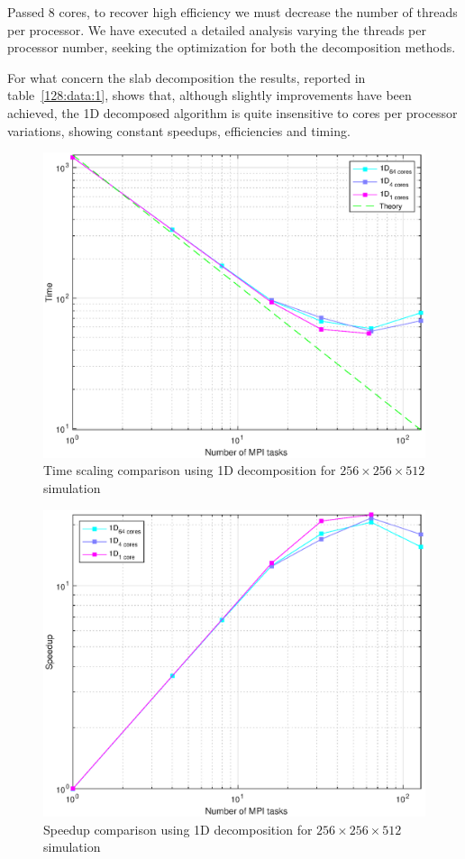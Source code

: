 \par
Passed 8 cores, to recover high efficiency we must decrease the number of threads per processor. We have executed a detailed analysis varying the threads per processor number, seeking the optimization for both the decomposition methods.
\par
For what concern the slab decomposition the results, reported in table~\ref{128:data:1}, shows that, although slightly improvements have been achieved, the 1D decomposed algorithm is quite insensitive to cores per processor variations, showing constant speedups, efficiencies and timing.
\par 
\begin{figure}
\begin{center}
\includegraphics[scale=0.55]{grafici/1284}
\caption{Time scaling comparison using 1D decomposition for $256\times 256\times 512$  simulation}
\label{1284}
\end{center}
\end{figure}
\begin{figure}
\begin{center}
\includegraphics[scale=0.55]{grafici/1286}
\caption{Speedup comparison using 1D decomposition for $256\times 256\times 512$  simulation}
\label{1286}
\end{center}
\end{figure}
